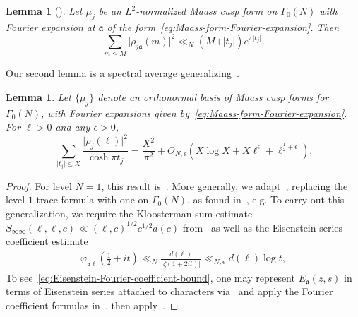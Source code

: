 \documentclass[11pt,reqno]{amsart}
\theoremstyle{plain}
\newtheorem{lemma}[theorem]{Lemma}
\theoremstyle{definition}
\numberwithin{equation}{section}
\begin{document}
\begin{lemma}[{\cite[(8.7)]{Iwaniec02}}] \label{lem:Maass-form-coefficient-average}
Let $\mu_j$ be an $L^2$-normalized Maass cusp form on $\Gamma_0(N)$ with Fourier expansion at $\mathfrak{a}$ of the form~\eqref{eq:Maass-form-Fourier-expansion}. Then
\[
	\sum_{m \leq M} \vert \rho_{j \mathfrak{a}}(m) \vert^2
	\ll_{N} (M + \vert t_j \vert) e^{\pi \vert t_j \vert}.
\]
\end{lemma}

Our second lemma is a spectral average generalizing~\cite[Theorem 6]{Kuznetsov80}.

\begin{lemma} \label{lem:Kuznetsov-long} 
Let $\{\mu_j\}$ denote an orthonormal basis of Maass cusp forms for $\Gamma_0(N)$, with Fourier expansions given by~\eqref{eq:Maass-form-Fourier-expansion}. For $\ell > 0$ and any $\epsilon > 0$,
\[
	\sum_{\vert t_j \vert \leq X} 
	\frac{\vert \rho_j(\ell) \vert^2}{\cosh \pi t_j }
	= \frac{X^2}{\pi^2} + O_{N,\epsilon}(X \log X + X \ell^\epsilon + \ell^{\frac{1}{2}+\epsilon}).
\]
\end{lemma}

\begin{proof} For level $N=1$, this result is~\cite[Theorem 6]{Kuznetsov80}. More generally, we adapt~\cite[\S{6}]{Kuznetsov80}, replacing the level $1$ trace formula with one on $\Gamma_0(N)$, as found in~\cite[Lemma 4.7]{DeshouillersIwaniec82}, e.g. To carry out this generalization, we require the Kloosterman sum estimate $S_{\infty\infty}(\ell,\ell,c) \ll (\ell,c)^{1/2} c^{1/2} d(c)$ from~\cite[Lemma 2.6]{DeshouillersIwaniec82} as well as the Eisenstein series coefficient estimate
\begin{align} \label{eq:Eisenstein-Fourier-coefficient-bound}
	\varphi_{\mathfrak{a} \ell}(\tfrac{1}{2}+it)
	\ll_{N} \frac{d(\ell)}{\vert \zeta(1+2it) \vert}
	\ll_{N,\epsilon} d(\ell) \log t,
\end{align}
To see~\eqref{eq:Eisenstein-Fourier-coefficient-bound}, one may represent $E_\mathfrak{a}(z,s)$ in terms of Eisenstein series attached to characters via~\cite[Theorem 6.1]{Young19} and apply the Fourier coefficient formulas in~\cite[Proposition 4.1]{Young19}, then apply~\cite[(3.11.10)]{Titchmarsh86}.
\end{proof}
\end{document}
